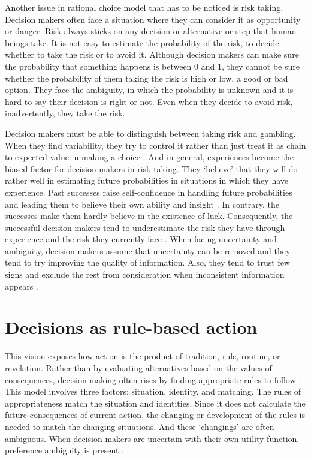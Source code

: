 Another issue in rational choice model that has to be noticed is risk taking. Decision makers often face a situation where they can consider it as opportunity or danger. Risk always sticks on any decision or alternative or step that human beings take. It is not easy to estimate the probability of the risk, to decide whether to take the risk or to avoid it. Although decision makers can make sure the probability that something happens is between 0 and 1, they cannot be sure whether the probability of them taking the risk is high or low, a good or bad option. They face the ambiguity, in which the probability is unknown and it is hard to say their decision is right or not. Even when they decide to avoid risk, inadvertently, they take the risk.

Decision makers must be able to distinguish between taking risk and gambling. When they find variability, they try to control it rather than just treat it as chain to expected value in making a choice \cite{7}. And in general, experiences become the biased factor for decision makers in risk taking. They ‘believe’ that they will do rather well in estimating future probabilities in situations in which they have experience. Past successes raise self-confidence in handling future probabilities and leading them to believe their own ability and insight \cite{2}. In contrary, the successes make them hardly believe in the existence of luck. Consequently, the successful decision makers tend to underestimate the risk they have through experience and the risk they currently face \cite{7}. When facing uncertainty and ambiguity, decision makers assume that uncertainty can be removed and they tend to try improving the quality of information. Also, they tend to trust few signs and exclude the rest from consideration when inconsistent information appears \cite{8}.

\section{Decisions as rule-based action}

This vision exposes how action is the product of tradition, rule, routine, or revelation. Rather than by evaluating alternatives based on the values of consequences, decision making often rises by finding appropriate rules to follow \cite{2}. This model involves three factors: situation, identity, and matching. The rules of appropriateness match the situation and identities. Since it does not calculate the future consequences of current action, the changing or development of the rules is needed to match the changing situations. And these ‘changings’ are often ambiguous. When decision makers are uncertain with their own utility function, preference ambiguity is present \cite{9}.

